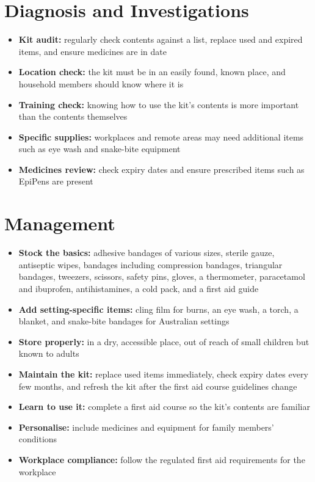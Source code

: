 \section*{Diagnosis and Investigations}
\begin{itemize}
    \item \textbf{Kit audit:} regularly check contents against a list, replace used and expired items, and ensure medicines are in date
    \item \textbf{Location check:} the kit must be in an easily found, known place, and household members should know where it is
    \item \textbf{Training check:} knowing how to use the kit's contents is more important than the contents themselves
    \item \textbf{Specific supplies:} workplaces and remote areas may need additional items such as eye wash and snake-bite equipment
    \item \textbf{Medicines review:} check expiry dates and ensure prescribed items such as EpiPens are present
\end{itemize}

\section*{Management}
\begin{itemize}
    \item \textbf{Stock the basics:} adhesive bandages of various sizes, sterile gauze, antiseptic wipes, bandages including compression bandages, triangular bandages, tweezers, scissors, safety pins, gloves, a thermometer, paracetamol and ibuprofen, antihistamines, a cold pack, and a first aid guide
    \item \textbf{Add setting-specific items:} cling film for burns, an eye wash, a torch, a blanket, and snake-bite bandages for Australian settings
    \item \textbf{Store properly:} in a dry, accessible place, out of reach of small children but known to adults
    \item \textbf{Maintain the kit:} replace used items immediately, check expiry dates every few months, and refresh the kit after the first aid course guidelines change
    \item \textbf{Learn to use it:} complete a first aid course so the kit's contents are familiar
    \item \textbf{Personalise:} include medicines and equipment for family members' conditions
    \item \textbf{Workplace compliance:} follow the regulated first aid requirements for the workplace
\end{itemize}

